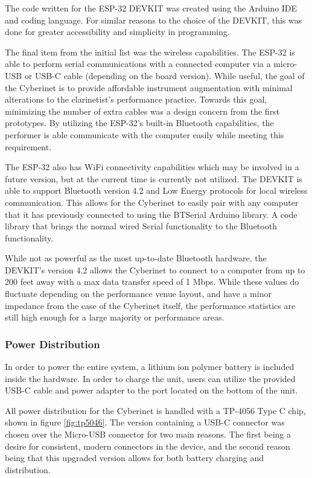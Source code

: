 The code written for the ESP-32 DEVKIT was created using the Arduino IDE and coding language. For similar reasons to the choice of the DEVKIT, this was done for greater accessibility and simplicity in programming. 

The final item from the initial list was the wireless capabilities. The ESP-32 is able to perform serial communications with a connected computer via a micro-USB or USB-C cable (depending on the board version). While useful, the goal of the Cyberinet is to provide affordable instrument augmentation with minimal alterations to the clarinetist's performance practice. Towards this goal, minimizing the number of extra cables was a design concern from the first prototypes. By utilizing the ESP-32's built-in Bluetooth capabilities, the performer is able communicate with the computer easily while meeting this requirement.

The ESP-32 also has WiFi connectivity capabilities which may be involved in a future version, but at the current time is currently not utilized. The DEVKIT is able to support Bluetooth version 4.2 and Low Energy protocols for local wireless communication. This allows for the Cyberinet to easily pair with any computer that it has previously connected to using the BTSerial Arduino library. A code library that brings the normal wired Serial functionality to the Bluetooth functionality.

While not as powerful as the most up-to-date Bluetooth hardware, the DEVKIT's version 4.2 allows the Cyberinet to connect to a computer from up to 200 feet away with a max data transfer speed of 1 Mbps. While these values do fluctuate depending on the performance venue layout, and have a minor impedance from the case of the Cyberinet itself, the performance statistics are still high enough for a large majority or performance areas.

\subsubsection{Power Distribution}
In order to power the entire system, a lithium ion polymer battery is included inside the hardware. In order to charge the unit, users can utilize the provided USB-C cable and power adapter to the port located on the bottom of the unit. %


All power distribution for the Cyberinet is handled with a TP-4056 Type C chip, shown in figure \ref{fig:tp5046}. The version containing a USB-C connector was chosen over the Micro-USB connector for two main reasons. The first being a desire for consistent, modern connectors in the device, and the second reason being that this upgraded version allows for both battery charging and distribution. 

